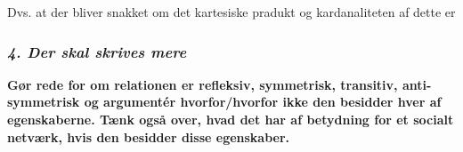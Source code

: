 \documentclass{article}
\begin{document}
\begin{Maple Normal}{
}\end{Maple Normal}
\begin{Maple Normal}{
Dvs. at der bliver snakket om det kartesiske pradukt 
 og kardanaliteten af dette er 
}\end{Maple Normal}

\begin{Maple Normal}{
}\end{Maple Normal}
\subsubsection{\textbf{\textit{4. Der skal skrives mere}}}
\begin{Maple Normal}{
\textbf{Gør rede for om relationen er reﬂeksiv, symmetrisk, transitiv, anti-\linebreak
}\textbf{symmetrisk og argumentér hvorfor/hvorfor ikke den besidder hver af\linebreak
}\textbf{egenskaberne. Tænk også over, hvad det har af betydning for et socialt\linebreak
}\textbf{netværk, hvis den besidder disse egenskaber.}}\end{Maple Normal}
\end{document}
